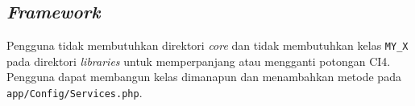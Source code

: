 \iffalse
\subsection{\textit{Events}}
\textit{Events} merupakan pembaharuan dari \textit{Hooks}. Pengguna harus mengubah
\begin{center}
	\verb|$hook['post_controller_constructor']|
\end{center} 
menjadi 
\begin{center} \verb|Events::on('post_controller_constructor', ['MyClass', 'MyFunction']);|
\end{center}
Dan menambahkan \textit{namespace} \verb|CodeIgniter\Events\Events;|. 
\fi

\subsection{\textit{Framework}}
Pengguna tidak membutuhkan direktori \textit{core} dan tidak membutuhkan kelas \verb|MY_X| pada direktori \textit{libraries} untuk memperpanjang atau mengganti potongan CI4. Pengguna dapat membangun kelas dimanapun dan menambahkan metode pada \verb|app/Config/Services.php|.